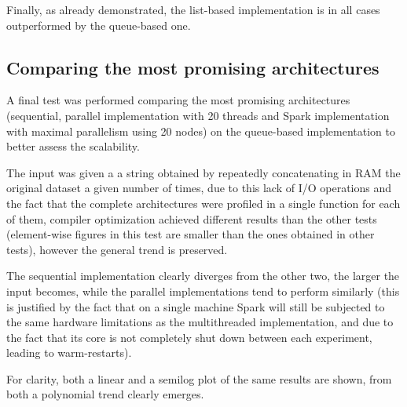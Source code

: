 Finally, as already demonstrated, the list-based implementation is in all cases outperformed by the queue-based one.

\subsection{Comparing the most promising architectures}
A final test was performed comparing the most promising architectures (sequential, parallel implementation with 20 threads and Spark implementation with maximal parallelism using 20 nodes) on the queue-based implementation to better assess the scalability.

The input was given a a string obtained by repeatedly concatenating in RAM the original dataset a given number of times, due to this lack of I/O operations and the fact that the complete architectures were profiled in a single function for each of them, compiler optimization achieved different results than the other tests (element-wise figures in this test are smaller than the ones obtained in other tests), however the general trend is preserved.

The sequential implementation clearly diverges from the other two, the larger the input becomes, while the parallel implementations tend to perform similarly (this is justified by the fact that on a single machine Spark will still be subjected to the same hardware limitations as the multithreaded implementation, and due to the fact that its core is not completely shut down between each experiment, leading to warm-restarts).

For clarity, both a linear and a semilog plot of the same results are shown, from both a polynomial trend clearly emerges.

